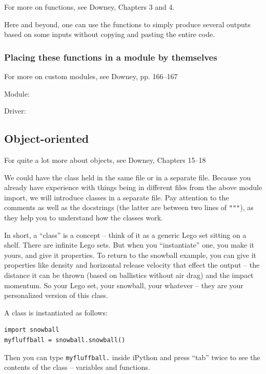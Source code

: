 \documentclass[a4paper,10pt]{scrartcl}
\begin{document}
\begin{framed}
For more on functions, see Downey, Chapters 3 and 4.
\end{framed}

Here and beyond, one can use the functions to simply produce several outputs based on some inputs without copying and pasting the entire code.



\subsubsection{Placing these functions in a module by themselves}

\begin{framed}
For more on custom modules, see Downey, pp. 166--167
\end{framed}

Module:


Driver:


\subsection{Object-oriented}

\begin{framed}
For quite a lot more about objects, see Downey, Chapters 15--18
\end{framed}

We could have the class held in the same file or in a separate file. Because you already have experience with things being in different files from the above module import, we will introduce classes in a separate file. Pay attention to the comments as well as the docstrings (the latter are between two lines of \lstinline{"""}), as they help you to understand how the classes work.

In short, a ``class'' is a concept -- think of it as a generic Lego set sitting on a shelf. There are infinite Lego sets. But when you ``instantiate'' one, you make it yours, and give it properties. To return to the snowball example, you can give it properties like density and horizontal release velocity that effect the output -- the distance it can be thrown (based on ballistics without air drag) and the impact momentum. So your Lego set, your snowball, your whatever -- they are your personalized version of this class.

A class is instantiated as follows:
\begin{lstlisting}
import snowball
myfluffball = snowball.snowball()
\end{lstlisting}
Then you can type \lstinline{myfluffball.} inside iPython and press ``tab'' twice to see the contents of the class -- variables and functions.
\end{document}
